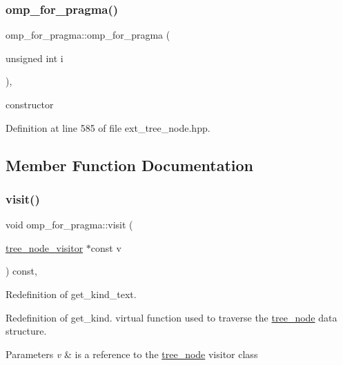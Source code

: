 \subsubsection{\texorpdfstring{omp\+\_\+for\+\_\+pragma()}{omp\_for\_pragma()}}
{\footnotesize\ttfamily omp\+\_\+for\+\_\+pragma\+::omp\+\_\+for\+\_\+pragma (\begin{DoxyParamCaption}\item[{unsigned int}]{i }\end{DoxyParamCaption})\hspace{0.3cm}{\ttfamily [inline]}, {\ttfamily [explicit]}}



constructor 



Definition at line 585 of file ext\+\_\+tree\+\_\+node.\+hpp.



\subsection{Member Function Documentation}
\mbox{\label{structomp__for__pragma_aaedfb731b705c0abadbc9fcb4a7bafef}} 
\subsubsection{\texorpdfstring{visit()}{visit()}}
{\footnotesize\ttfamily void omp\+\_\+for\+\_\+pragma\+::visit (\begin{DoxyParamCaption}\item[{\hyperlink{classtree__node__visitor}{tree\+\_\+node\+\_\+visitor} $\ast$const}]{v }\end{DoxyParamCaption}) const\hspace{0.3cm}{\ttfamily [override]}, {\ttfamily [virtual]}}



Redefinition of get\+\_\+kind\+\_\+text. 

Redefinition of get\+\_\+kind. virtual function used to traverse the \hyperlink{classtree__node}{tree\+\_\+node} data structure. 
\begin{DoxyParams}{Parameters}
{\em v} & is a reference to the \hyperlink{classtree__node}{tree\+\_\+node} visitor class \\
\hline
\end{DoxyParams}



